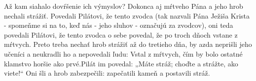 Až kam siahalo dovŕšenie ich výmyslov?
Dokonca aj mŕtveho Pána a jeho hrob nechali strážiť.
Povedali Pilátovi, že tento zvodca (tak nazvali Pána Ježiša Krista - spomeňme si na to, keď nás - jeho sluhov - označujú za zvodcov), oni teda povedali Pilátovi, že tento zvodca o sebe povedal, že po troch dňoch vstane z mŕtvych. Preto treba nechať hrob strážiť až do tretieho dňa, by azda neprišli jeho učeníci a neukradli ho a nepovedali ľudu: Vstal z mŕtvych, čím by bolo ostatné klamstvo horšie ako prvé.Pilát im povedal: „Máte stráž; choďte a strážte, ako viete!“ Oni šli a hrob zabezpečili: zapečatili kameň a postavili stráž.